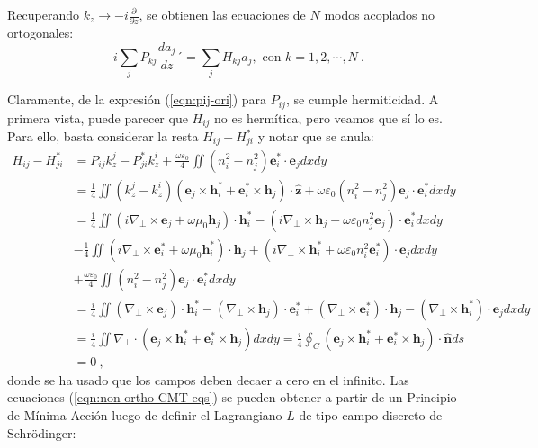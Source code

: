 Recuperando $k_z \to -i\frac{\partial}{\partial z}$, se obtienen las ecuaciones de $N$ modos acoplados no ortogonales:
\begin{equation}
	-i \sum_{j} P_{kj} \frac{d a_j}{dz} ´= \sum_{j} H_{kj} a_j, \text{ con }k=1,2,\cdots,N \ . \label{eqn:non-ortho-CMT-eqs}
\end{equation}
	
Claramente, de la expresión (\ref{eqn:pij-ori}) para $P_{ij}$, se cumple hermiticidad. A primera vista, puede parecer que $H_{ij}$ no es hermítica, pero veamos que sí lo es. Para ello, basta considerar la resta $H_{ij} - H_{ji}^*$ y notar que se anula:
\begin{align*}
 H_{ij} - H_{ji}^* &= P_{ij} k_z^j - P_{ji}^* k_z^i  + \frac{\omega \varepsilon_0}{4} \iint(n_i^2-n_j^2) \textbf{e}_i^* \cdot \textbf{e}_j dxdy
\\
&= \frac{1}{4} \iint (k_z^j-k_z^i)( \textbf{e}_j \times  \textbf{h}_i^* + \textbf{e}_i^* \times  \textbf{h}_j  )\cdot\hat{\textbf{z}} + \omega\varepsilon_0 (n_i^2-n_j^2) \textbf{e}_j \cdot \textbf{e}_i^* dxdy
\\
&= \frac{1}{4} \iint \left( i\nabla_\perp \times \textbf{e}_j +\omega\mu_0 \textbf{h}_j \right) \cdot \textbf{h}_i^* - \left( i\nabla_\perp \times \textbf{h}_j  - \omega\varepsilon_0n_j^2 \textbf{e}_j \right) \cdot \textbf{e}_i^*dxdy
\\
&- \frac{1}{4} \iint \left( i\nabla_\perp \times \textbf{e}_i^* +\omega\mu_0 \textbf{h}_i^*\right) \cdot \textbf{h}_j + \left(i\nabla_\perp \times \textbf{h}_i^*  + \omega\varepsilon_0n_i^2 \textbf{e}_i^* \right) \cdot \textbf{e}_jdxdy
\\
&+\frac{\omega\varepsilon_0}{4}\iint  \left(n_i^2-n_j^2\right) \textbf{e}_j \cdot \textbf{e}_i^* dxdy
\\
&= \frac{i}{4} \iint \left(\nabla_\perp\times\textbf{e}_j\right) \cdot \textbf{h}_i^*  -\left(\nabla_\perp\times\textbf{h}_j\right) \cdot \textbf{e}_i^* + \left(\nabla_\perp\times\textbf{e}_i^*\right) \cdot \textbf{h}_j - \left(\nabla_\perp\times\textbf{h}_i^*\right) \cdot \textbf{e}_j dxdy
\\
&= \frac{i}{4} \iint \nabla_\perp\cdot\left(\textbf{e}_j \times \textbf{h}_i^* +\textbf{e}_i^* \times \textbf{h}_j\right) dxdy =
\frac{i}{4} \oint_C \left(\textbf{e}_j \times \textbf{h}_i^* +\textbf{e}_i^* \times \textbf{h}_j\right) \cdot \hat{\textbf{n}} ds
\\
&=
0 \ ,
	\end{align*}
donde se ha usado que los campos deben decaer a cero en el infinito. Las ecuaciones (\ref{eqn:non-ortho-CMT-eqs}) se pueden obtener a partir de un Principio de Mínima Acción luego de definir el Lagrangiano $L$ de tipo campo discreto de Schrödinger:
